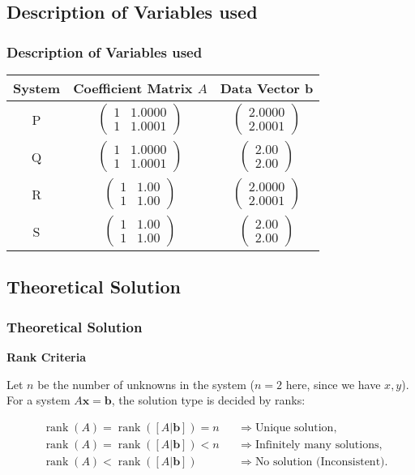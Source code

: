 \documentclass{beamer}
\theoremstyle{remark}
\newcommand{\myvec}[1]{\ensuremath{\begin{pmatrix}#1\end{pmatrix}}}
\let\vec\mathbf
\numberwithin{equation}{section}
\begin{document}
\subsection{Description of Variables used}
\begin{frame}
\frametitle{Description of Variables used}
\begin{table}[H]
\centering
\begin{tabular}{|c|c|c|}
\hline
System & Coefficient Matrix $A$ & Data Vector $\vec{b}$ \\
\hline
P & $\myvec{1 & 1.0000 \\ 1 & 1.0001}$ & $\myvec{2.0000 \\ 2.0001}$ \\
Q & $\myvec{1 & 1.0000 \\ 1 & 1.0001}$ & $\myvec{2.00 \\ 2.00}$ \\
R & $\myvec{1 & 1.00 \\ 1 & 1.00}$ & $\myvec{2.0000 \\ 2.0001}$ \\
S & $\myvec{1 & 1.00 \\ 1 & 1.00}$ & $\myvec{2.00 \\ 2.00}$ \\
\hline
\end{tabular}
\end{table}


\end{frame}

\subsection{Theoretical Solution }
\begin{frame}
\frametitle{Theoretical Solution}
\textbf{Rank Criteria}

Let $n$ be the number of unknowns in the system 
($n=2$ here, since we have $x,y$).  
For a system $A\vec{x}=\vec{b}$, the solution type is decided by ranks:

\[
\begin{aligned}
&\operatorname{rank}(A)=\operatorname{rank}([A|\vec{b}])=n 
&&\Rightarrow \text{Unique solution}, \\[6pt]
&\operatorname{rank}(A)=\operatorname{rank}([A|\vec{b}])<n 
&&\Rightarrow \text{Infinitely many solutions}, \\[6pt]
&\operatorname{rank}(A)<\operatorname{rank}([A|\vec{b}]) 
&&\Rightarrow \text{No solution (Inconsistent)}.
\end{aligned}
\]


\end{frame}
\end{document}
